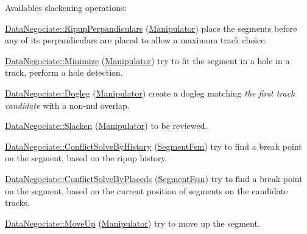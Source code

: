 Availables slackening operations\+:
\begin{DoxyEnumerate}
\item \hyperlink{classKite_1_1DataNegociate_ab7ccb6fc1f298728995250a3bbcf18c7a19d8d157762b2b73c5274e4865523d29}{Data\+Negociate\+::\+Ripup\+Perpandiculars} (\hyperlink{classKite_1_1Manipulator}{Manipulator}) place the segments before any of it\textquotesingle{}s perpandiculars are placed to allow a maximum track choice.
\item \hyperlink{classKite_1_1DataNegociate_ab7ccb6fc1f298728995250a3bbcf18c7a548e204a4e2ffae50774910737f11380}{Data\+Negociate\+::\+Minimize} (\hyperlink{classKite_1_1Manipulator}{Manipulator}) try to fit the segment in a hole in a track, perform a hole detection.
\item \hyperlink{classKite_1_1DataNegociate_ab7ccb6fc1f298728995250a3bbcf18c7a361bca46d5e7bdf02f50f7ecaa6018a9}{Data\+Negociate\+::\+Dogleg} (\hyperlink{classKite_1_1Manipulator}{Manipulator}) create a dogleg matching {\itshape the first track candidate} with a non-\/nul overlap.
\item \hyperlink{classKite_1_1DataNegociate_ab7ccb6fc1f298728995250a3bbcf18c7a0d4bff02b3163821c0e5f7ad9dd55f36}{Data\+Negociate\+::\+Slacken} (\hyperlink{classKite_1_1Manipulator}{Manipulator}) to be reviewed.
\item \hyperlink{classKite_1_1DataNegociate_ab7ccb6fc1f298728995250a3bbcf18c7ae08187cba35efd6229ab8acfd003a600}{Data\+Negociate\+::\+Conflict\+Solve\+By\+History} (\hyperlink{classKite_1_1SegmentFsm}{Segment\+Fsm}) try to find a break point on the segment, based on the ripup history.
\item \hyperlink{classKite_1_1DataNegociate_ab7ccb6fc1f298728995250a3bbcf18c7afce071be0ba39626ed1c865789da598b}{Data\+Negociate\+::\+Conflict\+Solve\+By\+Placeds} (\hyperlink{classKite_1_1SegmentFsm}{Segment\+Fsm}) try to find a break point on the segment, based on the current position of segments on the candidate tracks.
\item \hyperlink{classKite_1_1DataNegociate_ab7ccb6fc1f298728995250a3bbcf18c7adfd76a7d65b56ed7ecc0eedf921d6f82}{Data\+Negociate\+::\+Move\+Up} (\hyperlink{classKite_1_1Manipulator}{Manipulator}) try to move up the segment.
\end{DoxyEnumerate}

